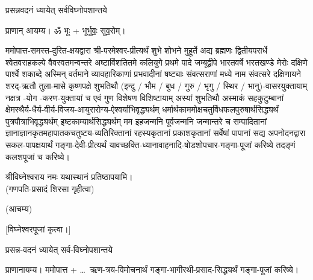 



{प्रसन्नवदनं ध्यायेत् सर्वविघ्नोपशान्तये}

प्राणान् आयम्य। ॐ भूः + भूर्भुवः॒ सुव॒रोम्।


ममोपात्त-समस्त-दुरित-क्षयद्वारा श्री-परमेश्वर-प्रीत्यर्थं शुभे शोभने मुहूर्ते अद्य ब्रह्मणः
द्वितीयपरार्धे श्वेतवराहकल्पे वैवस्वतमन्वन्तरे अष्टाविंशतितमे कलियुगे प्रथमे पादे
जम्बूद्वीपे भारतवर्षे भरतखण्डे मेरोः दक्षिणे पार्श्वे शकाब्दे अस्मिन् वर्तमाने व्यावहारिकाणां प्रभवादीनां षष्ट्याः संवत्सराणां मध्ये \blank{} नाम संवत्सरे दक्षिणायने
शरद्-ऋतौ तुला-मासे कृष्णपक्षे \blank{} शुभतिथौ
(इन्दु / भौम / बुध / गुरु / भृगु / स्थिर / भानु)-वासरयुक्तायाम्
\blank{} नक्षत्र \blank{}-योग \blank-करण-युक्तायां च एवं गुण विशेषण विशिष्टायाम्
अस्यां \blank{} शुभतिथौ
अस्माकं सहकुटुम्बानां क्षेमस्थैर्य-धैर्य-वीर्य-विजय-आयुरारोग्य-ऐश्वर्याभिवृद्ध्यर्थम्
धर्मार्थकाममोक्ष\-चतुर्विधफलपुरुषार्थसिद्ध्यर्थं पुत्रपौत्राभि\-वृद्ध्यर्थम् इष्टकाम्यार्थसिद्ध्यर्थम्
मम इहजन्मनि पूर्वजन्मनि जन्मान्तरे च सम्पादितानां ज्ञानाज्ञानकृतमहा\-पातकचतुष्टय-व्यतिरिक्तानां रहस्यकृतानां प्रकाशकृतानां सर्वेषां पापानां सद्य अपनोदनद्वारा सकल-पापक्षयार्थं
गङ्गा-देवी-प्रीत्यर्थं
यावच्छक्ति-ध्यानावाहनादि-षोडशोपचार-गङ्गा-पूजां करिष्ये तदङ्गं कलशपूजां च करिष्ये।

श्रीविघ्नेश्वराय नमः यथास्थानं प्रतिष्ठापयामि।\\
(गणपति-प्रसादं शिरसा गृहीत्वा)













\renewcommand{\devAya}{गङ्गा-देव्यै नमः,}
(आचम्य)

[विघ्नेश्वरपूजां कृत्वा।]

{प्रसन्न-वदनं ध्यायेत् सर्व-विघ्नोपशान्तये}

प्राणानायम्य। ममोपात्त + \ldots\     ऋण-त्रय-विमोचनार्थं गङ्गा-भागीरथी-प्रसाद-सिद्ध्यर्थं गङ्गा-पूजां करिष्ये।

